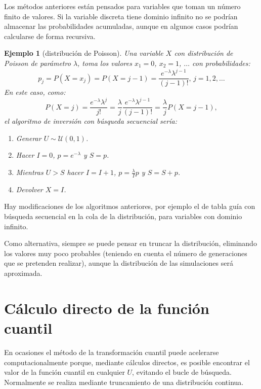 \documentclass[
]{book}
\theoremstyle{break}
\newtheorem{example}{Ejemplo}[chapter]
\theoremstyle{nonumberplain}
\begin{document}
Los métodos anteriores están pensados para variables que toman un número finito de valores.
Si la variable discreta tiene dominio infinito no se podrían almacenar las probabilidades acumuladas, aunque en algunos casos podrían calcularse de forma recursiva.

\begin{example}[distribución de Poisson]

Una variable \(X\) con distribución de Poisson de parámetro \(\lambda\),
toma los valores \(x_{1}=0\), \(x_{2}=1\), \(\ldots\) con probabilidades:
\[p_{j}=P\left( X=x_{j}\right)  =P\left( X=j-1\right)  =\frac{e^{-\lambda
}\lambda^{j-1}}{\left( j-1\right)  !}\text{, }j=1,2,\ldots\]
En este caso, como:
\[P\left( X=j\right)  =\frac{e^{-\lambda}\lambda^{j}}{j!}
=\frac{\lambda}{j}\frac{e^{-\lambda}\lambda^{j-1}}{\left( j-1\right)  !}
=\frac{\lambda}{j}P\left( X=j-1\right),\]
el algoritmo de inversión con búsqueda secuencial sería:

\begin{enumerate}
\def\labelenumi{\arabic{enumi}.}
\item
  Generar \(U\sim \mathcal{U}\left( 0,1\right)\).
\item
  Hacer \(I=0\), \(p=e^{-\lambda}\) y \(S=p\).
\item
  Mientras \(U>S\) hacer \(I=I+1\), \(p=\frac{\lambda}{I}p\) y \(S=S+p\).
\item
  Devolver \(X=I\).
\end{enumerate}

\end{example}

Hay modificaciones de los algoritmos anteriores, por ejemplo el de tabla guía con búsqueda secuencial en la cola de la distribución, para variables con dominio infinito.

Como alternativa, siempre se puede pensar en truncar la distribución,
eliminando los valores muy poco probables (teniendo en cuenta el número de generaciones que se pretenden realizar),
aunque la distribución de las simulaciones será aproximada.

\hypertarget{cuxe1lculo-directo-de-la-funciuxf3n-cuantil}{%
\section{Cálculo directo de la función cuantil}\label{cuxe1lculo-directo-de-la-funciuxf3n-cuantil}}

En ocasiones el método de la transformación cuantil puede acelerarse computacionalmente porque, mediante cálculos directos, es posible encontrar el valor de la función cuantil en cualquier \(U\), evitando el bucle de búsqueda.
Normalmente se realiza mediante truncamiento de una distribución continua.
\end{document}
